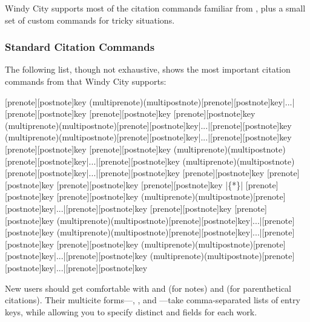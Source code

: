 \documentclass[11pt,letterpaper,oneside]{article}
\begin{document}
Windy City supports most of the citation commands familiar from
\biblatex, plus a small set of custom commands for tricky situations.

\subsubsection{Standard Citation Commands}
\label{std.cmd}

The following list, though not exhaustive, shows the most important
citation commands from \biblatex that Windy City supports:

\begin{ltxsyntax}
[prenote][postnote]{key}
(multiprenote)(multipostnote)[prenote][postnote]{key}|...|[prenote][postnote]{key}
[prenote][postnote]{key}
[prenote][postnote]{key}
(multiprenote)(multipostnote)[prenote][postnote]{key}|...|[prenote][postnote]{key}
(multiprenote)(multipostnote)[prenote][postnote]{key}|...|[prenote][postnote]{key}
[prenote][postnote]{key}
[prenote][postnote]{key}
(multiprenote)(multipostnote)[prenote][postnote]{key}|...|[prenote][postnote]{key}
(multiprenote)(multipostnote)[prenote][postnote]{key}|...|[prenote][postnote]{key}
[prenote][postnote]{key}
[prenote][postnote]{key}
[prenote][postnote]{key}
[prenote][postnote]{key}
|\{*\}|
[prenote][postnote]{key}
[prenote][postnote]{key}
(multiprenote)(multipostnote)[prenote][postnote]{key}|...|[prenote][postnote]{key}
[prenote][postnote]{key}
[prenote][postnote]{key}
(multiprenote)(multipostnote)[prenote][postnote]{key}|...|[prenote][postnote]{key}
(multiprenote)(multipostnote)[prenote][postnote]{key}|...|[prenote][postnote]{key}
[prenote][postnote]{key}
(multiprenote)(multipostnote)[prenote][postnote]{key}|...|[prenote][postnote]{key}
(multiprenote)(multipostnote)[prenote][postnote]{key}|...|[prenote][postnote]{key}
\end{ltxsyntax}

\noindent New users should get comfortable with  and
 (for notes) and  (for parenthetical
citations). Their multicite forms---, , and
---take comma-separated lists of entry keys, while
allowing you to specify distinct  and
 fields for each work.
\end{document}
